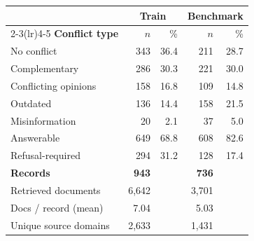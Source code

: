 {\tabstyle\setlength{\tabcolsep}{3pt}
\begin{tabular*}{\linewidth}[t]{@{\extracolsep{\fill}}l rr rr@{}}\toprule
& \multicolumn{2}{c}{\textbf{Train}} & \multicolumn{2}{c}{\textbf{Benchmark}}\\
\cmidrule(lr){2-3}\cmidrule(lr){4-5}
\textbf{Conflict type} & $n$ & \% & $n$ & \%\\\midrule
No conflict & 343 & 36.4 & 211 & 28.7\\
Complementary & 286 & 30.3 & 221 & 30.0\\
Conflicting opinions & 158 & 16.8 & 109 & 14.8\\
Outdated & 136 & 14.4 & 158 & 21.5\\
Misinformation & 20 & 2.1 & 37 & 5.0\\
\midrule
Answerable & 649 & 68.8 & 608 & 82.6\\
Refusal-required & 294 & 31.2 & 128 & 17.4\\
\midrule
\textbf{Records} & \textbf{943} & & \textbf{736} & \\
Retrieved documents & 6,642 & & 3,701 & \\
Docs / record (mean) & 7.04 & & 5.03 & \\
Unique source domains & 2,633 & & 1,431 & \\
\bottomrule\end{tabular*}}
